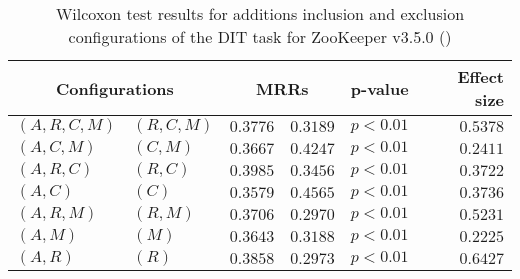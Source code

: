 
\begin{table}
\begin{spacing}{1.2}
\centering
\caption{Wilcoxon test results for additions inclusion and exclusion configurations of the DIT task for ZooKeeper v3.5.0 (\ctwo)}
\label{table:versus-wilcox-zookeeper-dit-additions}
\begin{tabular}{ll|rr|rr}
\toprule
      \multicolumn{2}{c|}{Configurations} &                \multicolumn{2}{c|}{MRRs} &             p-value & Effect size \\
\midrule
 $(A,R,C,M)$ &  $(R,C,M)$ &  $\bm{0.3776}$ &       $0.3189$ & $p<0.01$ &    $0.5378$ \\
   $(A,C,M)$ &    $(C,M)$ &       $0.3667$ &  $\bm{0.4247}$ & $p<0.01$ &    $0.2411$ \\
   $(A,R,C)$ &    $(R,C)$ &  $\bm{0.3985}$ &       $0.3456$ & $p<0.01$ &    $0.3722$ \\
     $(A,C)$ &      $(C)$ &       $0.3579$ &  $\bm{0.4565}$ & $p<0.01$ &    $0.3736$ \\
   $(A,R,M)$ &    $(R,M)$ &  $\bm{0.3706}$ &       $0.2970$ & $p<0.01$ &    $0.5231$ \\
     $(A,M)$ &      $(M)$ &  $\bm{0.3643}$ &       $0.3188$ & $p<0.01$ &    $0.2225$ \\
     $(A,R)$ &      $(R)$ &  $\bm{0.3858}$ &       $0.2973$ & $p<0.01$ &    $0.6427$ \\
\bottomrule
\end{tabular}

\end{spacing}
\end{table}


